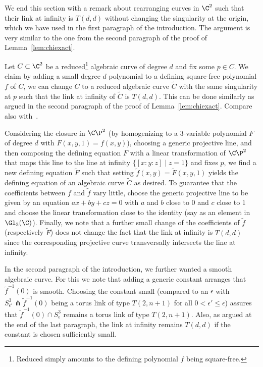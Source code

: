 We end this section with a remark about rearranging curves in $\C^2$ such that their link at infinity is $T(d,d)$ without changing the singularity at the origin, which we have used in the first paragraph of the introduction. The argument is very similar to the one from the second paragraph of the proof of Lemma~\ref{lem:chiexact}.
\begin{rema}\label{rem:T(d,d)atinfty}
Let $C\subset\C^2$ be a reduced\footnote{Reduced simply amounts to the defining polynomial $f$ being square-free.} algebraic curve of degree $d$ and fix some $p\in C$. We claim by adding a small degree $d$ polynomial to a defining square-free polynomial $f$ of $C$, we can change $C$ to a reduced algebraic curve $\widetilde{C}$ with the same singularity at $p$ such that the link at infinity of $\widetilde{C}$ is $T(d,d)$. This can be done similarly as argued in the second paragraph of the proof of Lemma~\ref{lem:chiexact}. Compare also with~\cite[Section~2]{Feller_15_MinCobBetweenTorusknots}.

Considering the closure in $\C\P^2$ (by homogenizing to a 3-variable polynomial $F$ of degree $d$ with $F(x,y,1)=f(x,y)$), choosing a generic projective line, and then composing the defining equation $F$ with a linear transformation of $\C\P^2$ that maps this line to the line at infinity $\{[x:y:z]\mid z=1\}$ and fixes $p$, we find a new defining equation $\widetilde{F}$ such that setting $\widetilde{f}(x,y)=\widetilde{F}(x,y,1)$ yields the defining equation of an algebraic curve $\widetilde{C}$ as desired. To guarantee that the coefficients between $f$ and $\widetilde{f}$ vary little, choose the generic projective line to be given by an equation $ax+by+cz=0$ with $a$ and $b$ close to $0$ and $c$ close to $1$ and choose the linear transformation close to the identity (say as an element in $\Gl_3(\C)$). Finally, we note that a further small change of the coefficients of $\widetilde{f}$ (respectively $\widetilde{F}$) does not change the fact that the link at infinity is $T(d,d)$ since the corresponding projective curve transversally intersects the line at infinity.

In the second paragraph of the introduction, we further wanted a smooth algebraic curve. For this we note that adding a generic constant arranges that $\widetilde{f}^{-1}(0)$ is smooth. Choosing the constant small (compared to an $\epsilon$ with $S^3_{\epsilon'}\pitchfork \widetilde{f}^{-1}(0)$ being a torus link of type $T(2,n+1)$ for all $0<\epsilon'\leq\epsilon$) assures that $\widetilde{f}^{-1}(0) \cap S^3_\epsilon$ remains a torus link of type $T(2,n+1)$. Also, as argued at the end of the last paragraph, the link at infinity remains $T(d,d)$ if the constant is chosen sufficiently small.
\end{rema}

